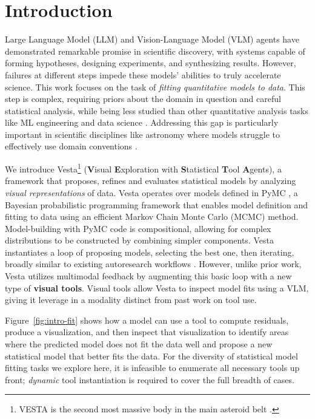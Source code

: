\documentclass{article}
\newcommand\gd[1]{\todo[color=red!40]{{\bf Greg}: #1}}
\newcommand{\method}{{\sc Vesta}}
\newcommand{\methodfull}{\textbf{V}isual \textbf{E}xploration with \textbf{S}tatistical
\textbf{T}ool \textbf{A}gents}
\begin{document}
\section{Introduction} 
Large Language Model (LLM) and Vision-Language Model (VLM) agents have demonstrated remarkable promise in scientific discovery, with systems capable of forming hypotheses, designing experiments, and synthesizing results. However, failures at different steps impede these models' abilities to truly accelerate science. This work focuses on the task of \textit{fitting quantitative models to data}. This step is complex, requiring priors about the domain in question and careful statistical analysis, while being less studied than other quantitative analysis tasks like ML engineering and data science \citep{dab_step, mle_bench}.
Addressing this gap is particularly important in scientific disciplines like astronomy where models struggle to effectively use domain conventions \cite{joseph2025astrovisbench}. 


We introduce \method{}\footnote{VESTA is the second most massive body in the main asteroid belt \cite{NASA4Vesta}.} (\methodfull{}), a framework that proposes, refines and evaluates statistical models by analyzing \textit{visual representations} of data. 
\method{} operates over models defined in PyMC \cite{pymc}, a Bayesian probabilistic programming framework that enables model definition and fitting to data using an efficient Markov Chain Monte Carlo (MCMC) method. Model-building with PyMC code is compositional, allowing for complex distributions to be constructed by combining simpler components. 
\method{} instantiates a loop of proposing models, selecting the best one, then iterating, broadly similar to existing autoresearch workflows \citep{execution_grounded_research, ada_evolve}. However, unlike prior work, \method{} utilizes multimodal feedback by augmenting this basic loop 
with a new type of \textbf{visual tools}. Visual tools allow \method{} to inspect model fits using a VLM, giving it leverage in a modality distinct from past work on tool use. 

Figure~\ref{fig:intro-fit} shows how a model can use a tool to compute residuals, produce a visualization, and then inspect that visualization to identify areas where the predicted model does not fit the data well and propose a new statistical model that better fits the data. For the diversity of statistical model fitting tasks we explore here, it is infeasible to enumerate all necessary tools up front;  \emph{dynamic} tool instantiation is required to cover the full breadth of cases.
\end{document}
